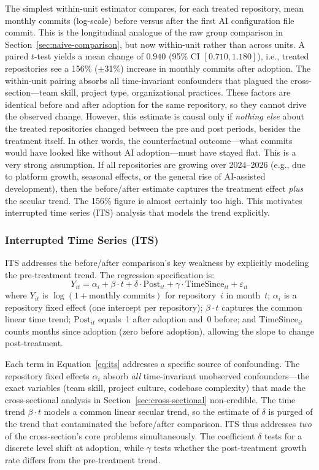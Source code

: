 The simplest within-unit estimator compares, for each treated repository, mean monthly commits (log-scale) before versus after the first AI configuration file commit.
This is the longitudinal analogue of the raw group comparison in Section~\ref{sec:naive-comparison}, but now within-unit rather than across units.
A paired $t$-test yields a mean change of $0.940$ (95\% CI $[0.710, 1.180]$), i.e., treated repositories see a 156\% ($\pm$31\%) increase in monthly commits after adoption.
The within-unit pairing absorbs all time-invariant confounders that plagued the cross-section---team skill, project type, organizational practices.
These factors are identical before and after adoption for the same repository, so they cannot drive the observed change.
However, this estimate is causal only if \emph{nothing else} about the treated repositories changed between the pre and post periods, besides the treatment itself.
In other words, the counterfactual outcome---what commits would have looked like without AI adoption---must have stayed flat.
This is a very strong assumption.
If all repositories are growing over 2024--2026 (e.g., due to platform growth, seasonal effects, or the general rise of AI-assisted development), then the before/after estimate captures the treatment effect \emph{plus} the secular trend.
The 156\% figure is almost certainly too high.
This motivates interrupted time series (ITS) analysis that models the trend explicitly.

\subsubsection{Interrupted Time Series (ITS)}
\label{sec:its}

ITS addresses the before/after comparison's key weakness by explicitly modeling the pre-treatment trend.
The regression specification is:
\begin{equation}
\label{eq:its}
Y_{it} = \alpha_i + \beta \cdot t + \delta \cdot \text{Post}_{it} + \gamma \cdot \text{TimeSince}_{it} + \varepsilon_{it}
\end{equation}
where $Y_{it}$ is $\log(1 + \text{monthly commits})$ for repository~$i$ in month~$t$; $\alpha_i$ is a repository fixed effect (one intercept per repository); $\beta \cdot t$ captures the common linear time trend; $\text{Post}_{it}$ equals~1 after adoption and~0 before; and $\text{TimeSince}_{it}$ counts months since adoption (zero before adoption), allowing the slope to change post-treatment.

Each term in Equation~\ref{eq:its} addresses a specific source of confounding.
The repository fixed effects $\alpha_i$ absorb \emph{all} time-invariant unobserved confounders---the exact variables (team skill, project culture, codebase complexity) that made the cross-sectional analysis in Section~\ref{sec:cross-sectional} non-credible.
The time trend $\beta \cdot t$ models a common linear secular trend, so the estimate of $\delta$ is purged of the trend that contaminated the before/after comparison.
ITS thus addresses \emph{two} of the cross-section's core problems simultaneously.
The coefficient $\delta$ tests for a discrete level shift at adoption, while $\gamma$ tests whether the post-treatment growth rate differs from the pre-treatment trend.


